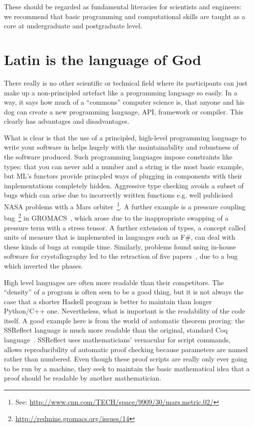 \documentclass[conference]{IEEEtran}
\begin{document}
These should be regarded as fundamental literacies for scientists and
engineers: we recommend that basic programming and computational
skills are taught as a core at undergraduate and postgraduate level.


\section{Latin is the language of God} 

There really is no other scientific or technical field where its
participants can just make up a non-principled artefact like a
programming language so easily. In a way, it says how much of a
``commons'' computer science is, that anyone and his dog can create a
new programming language, API, framework or compiler. This clearly has
advantages and disadvantages.

What is clear is that the use of a principled, high-level programming
language to write your software in helps hugely with the
maintainability and robustness of the software produced. Such
programming languages impose constraints like types: that you can
never add a number and a string is the most basic example, but ML's
functors provide princpled ways of plugging in components with their
implementations completely hidden. Aggressive type checking avoids a
subset of bugs which can arise due to incorrectly written functions
e.g. well publicised NASA problems with a Mars orbiter~\footnote{See:
\url{http://www.cnn.com/TECH/space/9909/30/mars.metric.02/}}.  A
further example is a pressure coupling
bug~\footnote{\url{http://redmine.gromacs.org/issues/14}} in
GROMACS~\cite{Hess2008}, which arose due to the inappropriate swapping
of a pressure term with a stress tensor.  A further extension of
types, a concept called units of measure that is implemented in
languages such as F\#, can deal with these kinds of bugs at compile
time. Similarly, problems found using in-house software for
crystallography led to the retraction of five papers~\cite{Miller2006}, due
to a bug which inverted the phases.

High level languages are often more readable than their
competitors. The ``density'' of a program is often seen to be a good
thing, but it is not always the case that a shorter Haskell program is
better to maintain than longer Python/C++ one. Nevertheless, what is
important is the readability of the code itself. A good example here
is from the world of automatic theorem proving: the SSReflect language
is much more readable than the original, standard Coq
language~\cite{GonthierZND13}. SSReflect uses mathematicians'
vernacular for script commands, allows reproducibility of automatic
proof checking because parameters are named rather than numbered. 
Even though these proof scripts are really only ever going to be
run by a machine, they seek to maintain the basic mathematical idea
that a proof should be readable by another mathematician.
\end{document}
